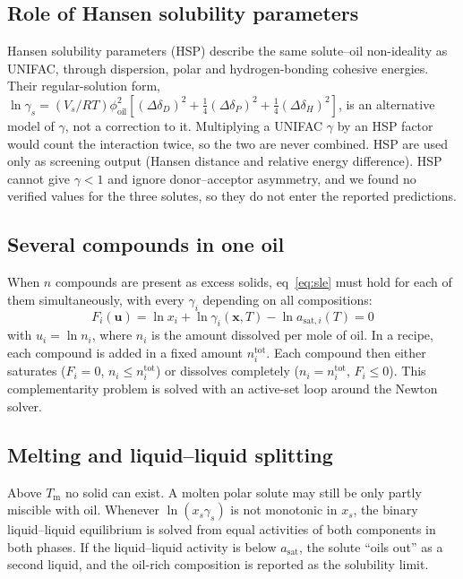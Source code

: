 \documentclass[journal=jceaax,manuscript=article,layout=twocolumn]{achemso}
\begin{document}
\subsection{Role of Hansen solubility parameters}
Hansen solubility parameters (HSP) describe the same solute--oil non-ideality as UNIFAC, through dispersion, polar and hydrogen-bonding cohesive energies. Their regular-solution form, $\ln\gamma_s=(V_s/RT)\phi_\mathrm{oil}^2[(\Delta\delta_D)^2+\tfrac14(\Delta\delta_P)^2+\tfrac14(\Delta\delta_H)^2]$, is an alternative model of $\gamma$, not a correction to it.\cite{hansen2007} Multiplying a UNIFAC $\gamma$ by an HSP factor would count the interaction twice, so the two are never combined. HSP are used only as screening output (Hansen distance and relative energy difference). HSP cannot give $\gamma<1$ and ignore donor--acceptor asymmetry, and we found no verified values for the three solutes, so they do not enter the reported predictions.

\subsection{Several compounds in one oil}
When $n$ compounds are present as excess solids, eq~\ref{eq:sle} must hold for each of them simultaneously, with every $\gamma_i$ depending on all compositions:
\begin{equation}
F_i(\mathbf{u})=\ln x_i+\ln\gamma_i(\mathbf{x},T)-\ln a_{\mathrm{sat},i}(T)=0
\label{eq:mix}
\end{equation}
with $u_i=\ln n_i$, where $n_i$ is the amount dissolved per mole of oil. In a recipe, each compound is added in a fixed amount $n_i^\mathrm{tot}$. Each compound then either saturates ($F_i=0$, $n_i\le n_i^\mathrm{tot}$) or dissolves completely ($n_i=n_i^\mathrm{tot}$, $F_i\le0$). This complementarity problem is solved with an active-set loop around the Newton solver.

\subsection{Melting and liquid--liquid splitting}
Above $T_\mathrm{m}$ no solid can exist. A molten polar solute may still be only partly miscible with oil. Whenever $\ln(x_s\gamma_s)$ is not monotonic in $x_s$, the binary liquid--liquid equilibrium is solved from equal activities of both components in both phases. If the liquid--liquid activity is below $a_\mathrm{sat}$, the solute ``oils out'' as a second liquid, and the oil-rich composition is reported as the solubility limit.
\end{document}

